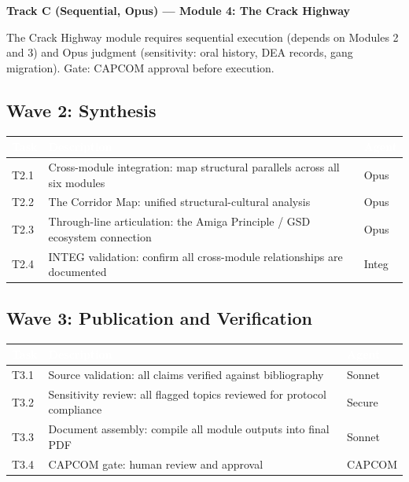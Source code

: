 \documentclass[11pt,letterpaper]{article}
\newcommand{\tableheader}[1]{\textbf{\sffamily\textcolor{white}{#1}}}
\begin{document}
\textbf{Track C (Sequential, Opus) --- Module 4: The Crack Highway}

The Crack Highway module requires sequential execution (depends on Modules 2 and 3) and Opus judgment (sensitivity: oral history, DEA records, gang migration). Gate: CAPCOM approval before execution.

\subsection{Wave 2: Synthesis}

\begin{center}
\begin{tabularx}{\textwidth}{L{2cm}XL{2cm}}
\toprule
{}
\tableheader{Task} & \tableheader{Description} & \tableheader{Agent} \\
\midrule
T2.1 & Cross-module integration: map structural parallels across all six modules & Opus \\
T2.2 & The Corridor Map: unified structural-cultural analysis & Opus \\
T2.3 & Through-line articulation: the Amiga Principle / GSD ecosystem connection & Opus \\
T2.4 & INTEG validation: confirm all cross-module relationships are documented & Integ \\
\bottomrule
\end{tabularx}
\end{center}

\subsection{Wave 3: Publication and Verification}

\begin{center}
\begin{tabularx}{\textwidth}{L{2cm}XL{2cm}}
\toprule
{}
\tableheader{Task} & \tableheader{Description} & \tableheader{Agent} \\
\midrule
T3.1 & Source validation: all claims verified against bibliography & Sonnet \\
T3.2 & Sensitivity review: all flagged topics reviewed for protocol compliance & Secure \\
T3.3 & Document assembly: compile all module outputs into final PDF & Sonnet \\
T3.4 & CAPCOM gate: human review and approval & CAPCOM \\
\bottomrule
\end{tabularx}
\end{center}
\end{document}
